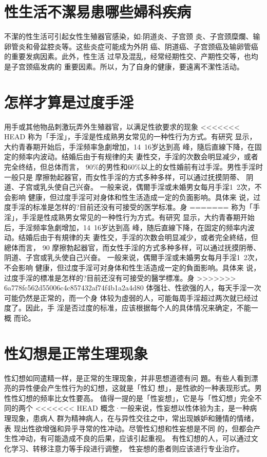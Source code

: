 \documentclass[12pt,UTF8]{ctexbook}
\begin{document}
\section{性生活不潔易患哪些婦科疾病}

不潔的性生活可引起女性生殖器官感染，如:阴道炎、子宫颈
炎、子宫颈糜爛、输卵管炎和骨盆腔炎等。这些炎症可能成为外阴
癌、阴道癌、子宫颈癌及输卵管癌的重要发病因素。此外，性生活
过早及混乱，经常经期性交、产期性交等，也均是子宫颈癌发病的
重要因素。所以，为了自身的健康，要遠离不潔性活动。

\section{怎样才算是过度手淫}

用手或其他物品刺激玩弄外生殖器官，以满足性欲要求的现象
<<<<<<< HEAD
称为「手淫」，手淫是性成熟男女常见的一种性行为方式。有研究
显示，大约青春期开始后，手淫频率急劇增加，14~16岁达到高
峰，隨后直線下降，在固定的频率内波动。结婚后由于有规律的夫
妻性交，手淫的次数会明显减少，或者完全终结，但总体而言，
90\%的男性和60\%以上的女性婚前有过手淫。男性手淫时一般只是
摩擦勃起器官，而女性手淫的方式多种多样，可以通过抚摸阴蒂、
阴道、子宫或乳头使自己兴奋。
一般来说，偶爾手淫或未婚男女每月手淫1~2次，不会影响
健康，但过度手淫可对身体和性生活造成一定的负面影响。具体来
说，过度手淫的标准是怎样的?目前还没有可接受的医学标准。身
=======
称为「手淫」，手淫是性成熟男女常见的一种性行为方式。有研究
显示，大约青春期开始后，手淫频率急劇增加，14~16岁达到高
峰，随后直線下降，在固定的频率内波动。结婚后由于有規律的夫
妻性交，手淫的次数会明显减少，或者完全終结，但總体而言，
90%
摩擦勃起器官，而女性手淫的方式多种多样，可以通过抚摸阴蒂、
阴道、子宫或乳头使自己兴奋。
一般来说，偶爾手淫或未婚男女每月手淫1~2次，不会影响
健康，但过度手淫可对身体和性生活造成一定的負面影响。具体来
说，过度手淫的標准是怎样的?目前还沒有可接受的醫学標准。身
>>>>>>> 6a778fc562d55006c4c857432af74f4b1a2a4d80
体强壮、性欲强的人，每天手淫一次可能仍然是正常的，而一个身
体较为虛弱的人，可能每周手淫超过两次就已经过度了。因此，手
淫是否过度的标准，应该根据每个人的具体情况来确定，不能一概
而论。
\section{性幻想是正常生理现象}
性幻想如同遣精一样，是正常的生理现象，并非思想道德有问
題。有些人看到漂亮的异性便会产生性行为的幻想，这就是「性幻
想」，是性欲的一种表现形式。男性性幻想的频率比女性要高。
值得一提的是「性妄想」，它是与「性幻想」完全不同的两个
<<<<<<< HEAD
概念·一般来说，性妄想以性体验为主，是一种病理现象，患病人
群为精神病人，在与异性交往之中，常出现嫉妒和鍾情的情绪，表
现出性欲增强和异乎寻常的性冲动。尽管性幻想和性妄想是不同
的，但都会产生性冲动，有可能造成不良的后果，应该引起重视。
有性幻想的人，可以通过文化学习、转移注意力等手段进行调整，
性妄想的患者则应该进行专业治疗。
\end{document}
